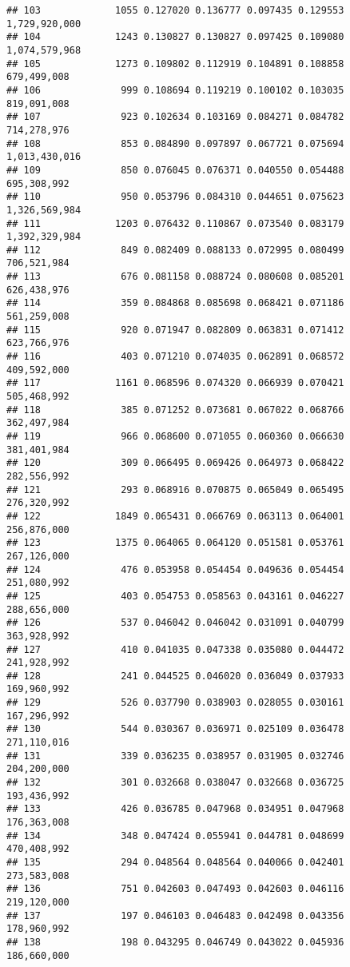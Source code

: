 \documentclass[]{article}
\begin{document}
\begin{verbatim}
## 103             1055 0.127020 0.136777 0.097435 0.129553 1,729,920,000
## 104             1243 0.130827 0.130827 0.097425 0.109080 1,074,579,968
## 105             1273 0.109802 0.112919 0.104891 0.108858   679,499,008
## 106              999 0.108694 0.119219 0.100102 0.103035   819,091,008
## 107              923 0.102634 0.103169 0.084271 0.084782   714,278,976
## 108              853 0.084890 0.097897 0.067721 0.075694 1,013,430,016
## 109              850 0.076045 0.076371 0.040550 0.054488   695,308,992
## 110              950 0.053796 0.084310 0.044651 0.075623 1,326,569,984
## 111             1203 0.076432 0.110867 0.073540 0.083179 1,392,329,984
## 112              849 0.082409 0.088133 0.072995 0.080499   706,521,984
## 113              676 0.081158 0.088724 0.080608 0.085201   626,438,976
## 114              359 0.084868 0.085698 0.068421 0.071186   561,259,008
## 115              920 0.071947 0.082809 0.063831 0.071412   623,766,976
## 116              403 0.071210 0.074035 0.062891 0.068572   409,592,000
## 117             1161 0.068596 0.074320 0.066939 0.070421   505,468,992
## 118              385 0.071252 0.073681 0.067022 0.068766   362,497,984
## 119              966 0.068600 0.071055 0.060360 0.066630   381,401,984
## 120              309 0.066495 0.069426 0.064973 0.068422   282,556,992
## 121              293 0.068916 0.070875 0.065049 0.065495   276,320,992
## 122             1849 0.065431 0.066769 0.063113 0.064001   256,876,000
## 123             1375 0.064065 0.064120 0.051581 0.053761   267,126,000
## 124              476 0.053958 0.054454 0.049636 0.054454   251,080,992
## 125              403 0.054753 0.058563 0.043161 0.046227   288,656,000
## 126              537 0.046042 0.046042 0.031091 0.040799   363,928,992
## 127              410 0.041035 0.047338 0.035080 0.044472   241,928,992
## 128              241 0.044525 0.046020 0.036049 0.037933   169,960,992
## 129              526 0.037790 0.038903 0.028055 0.030161   167,296,992
## 130              544 0.030367 0.036971 0.025109 0.036478   271,110,016
## 131              339 0.036235 0.038957 0.031905 0.032746   204,200,000
## 132              301 0.032668 0.038047 0.032668 0.036725   193,436,992
## 133              426 0.036785 0.047968 0.034951 0.047968   176,363,008
## 134              348 0.047424 0.055941 0.044781 0.048699   470,408,992
## 135              294 0.048564 0.048564 0.040066 0.042401   273,583,008
## 136              751 0.042603 0.047493 0.042603 0.046116   219,120,000
## 137              197 0.046103 0.046483 0.042498 0.043356   178,960,992
## 138              198 0.043295 0.046749 0.043022 0.045936   186,660,000

\end{verbatim}
\end{document}
